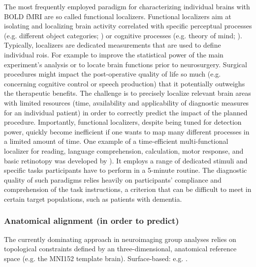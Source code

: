 
%
The most frequently employed paradigm for characterizing individual brains with
BOLD fMRI are so called functional localizers.
%
Functional localizers aim at isolating and localizing brain activity correlated
with specific perceptual processes (e.g. different object categories;
\citet{kanwisher1997ffa}) or cognitive processes (e.g. theory of mind;
\citet{spunt2014validating}).
%
Typically, localizers are dedicated measurements that are used to define
individual \acp{roi}.
%
For example to improve the statistical power of the main experiment's analysis
or to locate brain functions prior to neurosurgery.
Surgical procedures might impact the post-operative quality of life so much
(e.g. concerning cognitive control or speech production) that it potentially
outweighs the therapeutic benefits.
%
The challenge is to precisely localize relevant brain areas with limited
resources (time, availability and applicability of diagnostic measures for an
individual patient) in order to correctly predict the impact of the planned
procedure.
%
Importantly, functional localizers, despite being tuned for detection power,
quickly become inefficient if one wants to map many different processes in a
limited amount of time.
%
One example of a time-efficient multi-functional localizer for reading, language
comprehension, calculation, motor response, and basic retinotopy was developed
by \citep{pinel2007fast}).
%
It employs a range of dedicated stimuli and specific tasks participants have to
perform in a 5-minute routine.
%
The diagnostic quality of such paradigms relies heavily on participants'
compliance and comprehension of the task instructions, a criterion that can be
difficult to meet in certain target populations, such as patients with dementia.


\subsubsection{Anatomical alignment (in order to predict)}

The currently dominating approach in neuroimaging group analyses relies on
topological constraints defined by an three-dimensional, anatomical reference
space (e.g. the MNI152 template brain).
%
Surface-based: e.g. \citep{weiner2018defining}.


